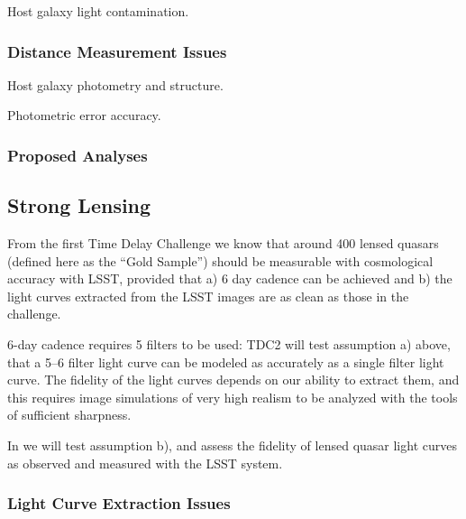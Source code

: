 Host galaxy light contamination.



\subsubsection{Distance Measurement Issues}
\label{sec:twinkles1:science:supernovae:distance}

Host galaxy photometry and structure.

Photometric error accuracy.


\subsubsection{Proposed Analyses}
\label{sec:twinkles1:science:supernovae:analyses}



\subsection{Strong Lensing}
\label{sec:twinkles1:science:stronglensing}

From the first Time Delay Challenge we know that around 400 lensed
quasars (defined here as the ``Gold Sample'') should be measurable
with cosmological accuracy with LSST, provided that a) 6 day cadence
can be achieved and b) the light curves extracted from the LSST images
are as clean as those in the challenge.

6-day cadence requires 5 filters to be used: TDC2 will test
assumption a) above, that  a 5--6 filter light curve can be modeled as
accurately as a single filter light curve. The fidelity of the light
curves depends on our ability to extract them, and this requires image
simulations of very high realism to be analyzed with the tools of
sufficient sharpness.

In \TwinklesOne we will test assumption b), and assess the fidelity of
lensed quasar light curves as observed and measured with the LSST system.


\subsubsection{Light Curve Extraction Issues}
\label{sec:twinkles1:science:stronglensing:monitor}

